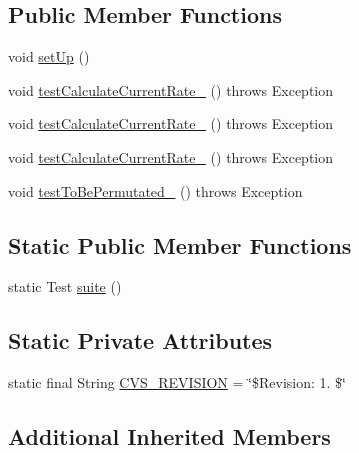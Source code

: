 \subsection*{Public Member Functions}
\begin{DoxyCompactItemize}
\item 
void \hyperlink{classorg_1_1jgap_1_1impl_1_1_default_crossover_rate_calculator_test_afd1d5ff08c077ec8aac04980e8d4dfdb}{set\-Up} ()
\item 
void \hyperlink{classorg_1_1jgap_1_1impl_1_1_default_crossover_rate_calculator_test_ad18a2b480837e48ab8a59532c6322d77}{test\-Calculate\-Current\-Rate\-\_} ()  throws Exception 
\item 
void \hyperlink{classorg_1_1jgap_1_1impl_1_1_default_crossover_rate_calculator_test_aace77c76af57cc08759540ae2c4d17ed}{test\-Calculate\-Current\-Rate\-\_} ()  throws Exception 
\item 
void \hyperlink{classorg_1_1jgap_1_1impl_1_1_default_crossover_rate_calculator_test_aaddb423ed16ca07c83759b60d2f85e3c}{test\-Calculate\-Current\-Rate\-\_} ()  throws Exception 
\item 
void \hyperlink{classorg_1_1jgap_1_1impl_1_1_default_crossover_rate_calculator_test_a0cd841d6222a0fbd4e28a8f0687ccede}{test\-To\-Be\-Permutated\-\_} ()  throws Exception 
\end{DoxyCompactItemize}
\subsection*{Static Public Member Functions}
\begin{DoxyCompactItemize}
\item 
static Test \hyperlink{classorg_1_1jgap_1_1impl_1_1_default_crossover_rate_calculator_test_acb4146e764cbf4e50f876c4c29787bd2}{suite} ()
\end{DoxyCompactItemize}
\subsection*{Static Private Attributes}
\begin{DoxyCompactItemize}
\item 
static final String \hyperlink{classorg_1_1jgap_1_1impl_1_1_default_crossover_rate_calculator_test_ad93979062e772f3b5440333b74ad4263}{C\-V\-S\-\_\-\-R\-E\-V\-I\-S\-I\-O\-N} = \char`\"{}\$Revision\-: 1. \$\char`\"{}
\end{DoxyCompactItemize}
\subsection*{Additional Inherited Members}



